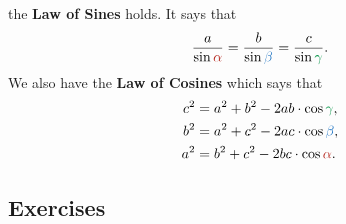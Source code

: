 \documentclass[a4paper,11pt]{article}
\newcommand{\clr}{\textcolor{BrickRed}}
\newcommand{\clb}{\textcolor{RoyalBlue}}
\newcommand{\clg}{\textcolor{ForestGreen}}
\begin{document}
the \textbf{Law of Sines} holds. It says that
\[
 \frac{a}{\sin \clr{\alpha}} = \frac{b}{\sin \clb{\beta}} = \frac{c}{\sin
  \clg{\gamma}}.
\]
We also have the \textbf{Law of Cosines} which says that
\begin{equation*}
 \begin{split}
  c^2 &= a^2 + b^2 - 2ab \cdot \cos \clg{\gamma}, \\
  b^2 &= a^2 + c^2 - 2ac \cdot \cos \clb{\beta}, \\
  a^2 &= b^2 + c^2 - 2bc \cdot \cos \clr{\alpha}. \\
 \end{split}
\end{equation*}

\subsection*{Exercises}
\end{document}
